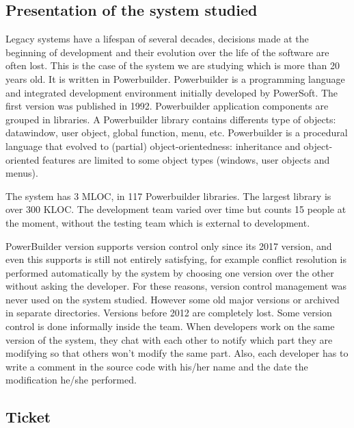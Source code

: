 \documentclass[10pt,conference]{IEEEtran}
\begin{document}
\subsection{Presentation of the system studied}

Legacy systems have a lifespan of several decades, decisions made at the beginning of development and their evolution over the life of the software are often lost. 
This is the case of the system we are studying which is more than 20 years old. 
It is written in Powerbuilder.
Powerbuilder is a programming language and integrated development environment initially developed by PowerSoft. The first version was published in 1992.
Powerbuilder application components are grouped in libraries. 
A Powerbuilder library contains differents type of objects: datawindow, user object, global function, menu, etc. 
Powerbuilder is a procedural language that evolved to (partial) object-orientedness: inheritance and object-oriented features are limited to some object types (windows, user objects and menus). 

The system has 3 MLOC, in 117 Powerbuilder libraries.
The largest library is over 300 KLOC.
The development team varied over time but counts 15 people at the moment, without the testing team which is external to development.

PowerBuilder version supports version control only since its 2017 version, and even this supports is still not entirely satisfying, for example
conflict resolution is performed automatically by the system by choosing one version over the other without asking the developer.
For these reasons, version control management was never used on the system studied.%
However some old major versions or archived in separate directories.
Versions before 2012 are completely lost.
Some version control is done informally inside the team.
When developers work on the same version of the system, they chat with each other to notify which part they are modifying so that others won't modify the same part.
Also, each developer has to write a comment in the source code with his/her name and the date the modification he/she performed. 


\subsection{Ticket}
\end{document}
